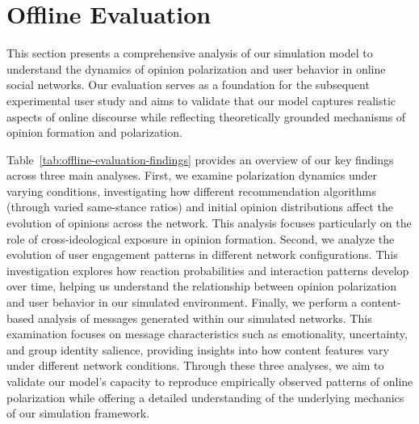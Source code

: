 \section{Offline Evaluation}
\label{sec:offline-evaluation}

This section presents a comprehensive analysis of our simulation model to understand the dynamics of opinion polarization and user behavior in online social networks. Our evaluation serves as a foundation for the subsequent experimental user study and aims to validate that our model captures realistic aspects of online discourse while reflecting theoretically grounded mechanisms of opinion formation and polarization.



Table~\ref{tab:offline-evaluation-findings} provides an overview of our key findings across three main analyses. First, we examine polarization dynamics under varying conditions, investigating how different recommendation algorithms (through varied same-stance ratios) and initial opinion distributions affect the evolution of opinions across the network. This analysis focuses particularly on the role of cross-ideological exposure in opinion formation. Second, we analyze the evolution of user engagement patterns in different network configurations. This investigation explores how reaction probabilities and interaction patterns develop over time, helping us understand the relationship between opinion polarization and user behavior in our simulated environment. Finally, we perform a content-based analysis of messages generated within our simulated networks. This examination focuses on message characteristics such as emotionality, uncertainty, and group identity salience, providing insights into how content features vary under different network conditions. Through these three analyses, we aim to validate our model's capacity to reproduce empirically observed patterns of online polarization while offering a detailed understanding of the underlying mechanics of our simulation framework.

